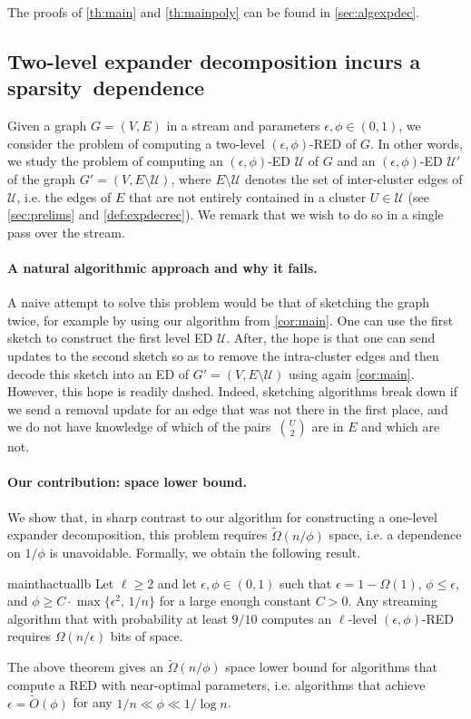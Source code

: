 \documentclass[epsfig,letter,11pt]{article}
\numberwithin{equation}{section}
\newcommand{\otil}{\tilde{O}}
\renewcommand{\tilde}{\widetilde}
\begin{document}
\noindent
The proofs of \cref{th:main} and \cref{th:mainpoly} can be found in \cref{sec:algexpdec}.
\subsection{Two-level expander decomposition incurs a sparsity~dependence}
\label{sec:techoverviewlb}
Given a graph $G=(V,E)$ in a stream and parameters $\epsilon,\phi \in (0,1)$, we consider the problem of computing a two-level $(\epsilon,\phi)$-RED of $G$. In other words, we study the problem of computing an $(\epsilon,\phi)$-ED $\mathcal{U}$ of $G$ and an $(\epsilon,\phi)$-ED $\mathcal{U'}$ of the graph $G'=(V,E\setminus \mathcal{U})$, where $E\setminus \mathcal{U}$ denotes the set of inter-cluster edges of $\mathcal{U}$, i.e. the edges of $E$ that are not entirely contained in a cluster $U \in \mathcal{U}$ (see \cref{sec:prelims} and \cref{def:expdecrec}). We remark that we wish to do so in a single pass over the stream.

\paragraph*{A natural algorithmic approach and why it fails.} A naive attempt to solve this problem would be that of sketching the graph twice, for example by using our algorithm from \cref{cor:main}. One can use the first sketch to construct the first level ED $\mathcal{U}$. After, the hope is that one can send updates to the second sketch so as to remove the intra-cluster edges and then decode this sketch into an ED of $G'=(V,E\setminus \mathcal{U})$ using again \cref{cor:main}. However, this hope is readily dashed. Indeed, sketching algorithms break down if we send a removal update for an edge that was not there in the first place, and we do not have knowledge of which of the pairs~$\binom{U}{2}$ are in $E$ and which are not.

\paragraph*{Our contribution: space lower bound.} We show that, in sharp contrast to our algorithm for constructing a one-level expander decomposition, this problem requires $\widetilde{\Omega}(n/\phi)$ space, i.e. a dependence on $1/\phi$ is unavoidable. Formally, we obtain the following result.

\begin{restatable}{mainthactual}{lb}
	\label{th:lb}
	Let $\ell \ge 2$ and let $\epsilon, \phi \in (0,1)$ such that $ \epsilon = 1-\Omega(1)$, $\phi \le \epsilon$, and $\phi \ge C \cdot\max\{\epsilon^2 , \, 1/n\}$ for a large enough constant $C > 0$. Any  streaming algorithm that with probability at least $9/10$ computes  an $\ell$-level $(\epsilon,\phi)$-RED requires {$\Omega(n/\epsilon)$} bits of space.
\end{restatable}
\noindent
The above theorem gives an $\widetilde{\Omega}(n/\phi)$ space lower bound for algorithms that compute a RED with near-optimal parameters, i.e. algorithms that achieve $\epsilon =\otil(\phi)$ for any $1/n \ll \phi \ll 1/\log n$.
\end{document}
